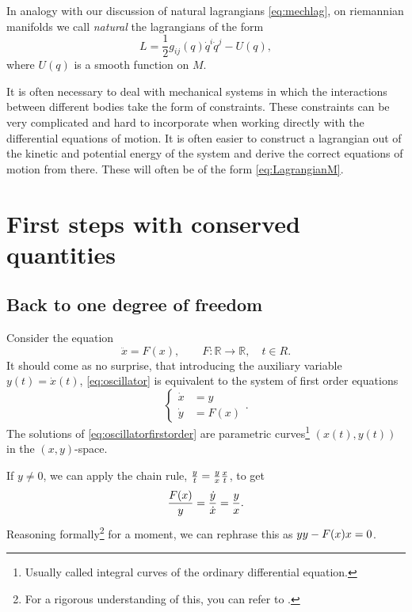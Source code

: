 \documentclass[english,fontsize=11pt,paper=a5,oneside]{scrbook}
\newcommand{\R}{\mathbb{R}}
\let\d\relax
\newcommand{\d}{\mathrm{d}}
\theoremstyle{definition}
\newenvironment{remark}
  {\pushQED{\qed}\renewcommand{\qedsymbol}{$\lozenge$}\remarkx}
  {\popQED\endremarkx}
\begin{document}
In analogy with our discussion of natural lagrangians \eqref{eq:mechlag}, on riemannian manifolds we call \emph{natural} the lagrangians of the form
\begin{equation}\label{eq:LagrangianM}
  L = \frac 12 g_{ij}(q)\dot q^i \dot q^j - U(q),
\end{equation}
where $U(q)$ is a smooth function on $M$.

\begin{remark}
  It  is  often  necessary  to  deal  with  mechanical  systems  in  which the interactions between different bodies take the form of constraints.
  These constraints can  be  very  complicated  and  hard  to  incorporate  when  working directly  with  the differential  equations  of  motion.
  It  is  often  easier  to  construct  a  lagrangian out of the kinetic and potential energy of the system and derive the correct equations of motion from there.
  These will often be of the form \eqref{eq:LagrangianM}.
\end{remark}

\section{First steps with conserved quantities}
\subsection{Back to one degree of freedom}\label{sec:bdf}

Consider the equation
\begin{equation}\label{eq:oscillator}
  \ddot x = F(x), \qquad F:\R\to\R, \quad t\in R.
\end{equation}
It should come as no surprise, that introducing the auxiliary variable $y(t) = \dot x(t)$, \eqref{eq:oscillator} is equivalent to the system of first order equations
\begin{equation}\label{eq:oscillatorfirstorder}
  \left\lbrace
  \begin{aligned}
    \dot x & = y    \\
    \dot y & = F(x)
  \end{aligned}
  \right..
\end{equation}
The solutions of \eqref{eq:oscillatorfirstorder} are parametric curves\footnote{Usually called integral curves of the ordinary differential equation.} $(x(t),y(t))$ in the $(x,y)$-space.

If $y\neq0$, we can apply the chain rule, $\frac{\d y}{\d t} = \frac{\d y}{\d x} \frac{\d x}{\d t}$, to get
\begin{equation}\label{eq:lef}
  \frac{F(x)}y = \frac{\dot y}{\dot x} = \frac{\d y}{\d x}.
\end{equation}
Reasoning formally\footnote{For a rigorous understanding of this, you can refer to \cite[Equation (5.1) with $f=y$ and Remark 5.1.3]{lectures:aom:seri}.} for a moment, we can rephrase this as $y \d y - F(x) \d x = 0$.
\end{document}
